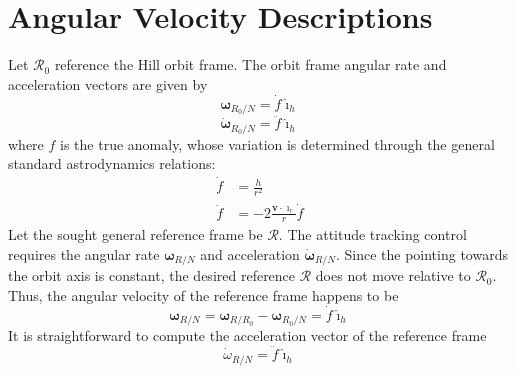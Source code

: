 \documentclass[]{AVSSimReportMemo}
\begin{document}
\section{Angular Velocity Descriptions}
Let $\mathcal{R}_{0}$ reference the Hill orbit frame. The orbit frame angular rate and acceleration vectors are given by 
\begin{equation}
	\label{eq:omega_R0}
	\bm\omega_{R_{0}/N} = \dot f \hat{\bm\imath}_{h} 
\end{equation}
\begin{equation}
	\label{eq:domega_R0}
	\dot{\bm\omega}_{R_{0}/N} = \ddot f \hat{\bm\imath}_{h} 
\end{equation}
where $f$ is the true anomaly, whose variation is determined through the general standard astrodynamics relations:
\begin{align}
  \dot f &= \frac{h}{r^{2}}
  \\
  \ddot f &= - 2 \frac{\bm v \cdot \hat{\bm\imath}_{r}}{r} \dot f
\end{align}
Let the sought general reference frame be $\mathcal{R}$. The attitude tracking control requires the angular rate $\bm\omega_{R/N}$ and acceleration $\dot{\bm\omega}_{R/N}$. 
Since the pointing towards the orbit axis is constant, the desired reference $\mathcal{R}$ does not move relative to $\mathcal{R}_{0}$. Thus, the angular velocity of the reference frame happens to be
\begin{equation}
	\label{eq:omega_R}
	\bm\omega_{R/N} = \bm\omega_{R/R_{0}} - \bm\omega_{R_{0}/N} = \dot{f} \hat{\bm\imath}_{h}
\end{equation}
It is straightforward to compute the acceleration vector of the reference frame
\begin{equation}
	\label{eq:domega_R}
	\dot\omega_{R/N} = \ddot{f} \hat{\bm\imath}_{h}
\end{equation}



\end{document}

